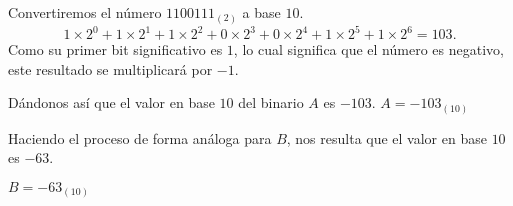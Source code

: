 \begin{frame}
\begin{solution}
\begin{enumerate}[a)]
			      Convertiremos el número ${1100111}_{\left(2\right)}$ a base $10$.
			      \begin{equation*}
				      1\times 2^{0}+
				      1\times2^{1}+
				      1\times2^{2}+
				      0\times2^{3}+
				      0\times2^{4}+
				      1\times2^{5}+
				      1\times2^{6}=
				      103.
			      \end{equation*}
			      Como su primer bit significativo es $1$, lo cual significa que el número es negativo, este resultado se multiplicará por $-1$.

			      Dándonos así que el valor en base $10$ del binario $A$ es $-103$. $A=-{103}_{\left(10\right)}$

			      Haciendo el proceso de forma análoga para $B$, nos resulta que el valor en base $10$ es $-63$.

			      $B=-{63}_{\left(10\right)}$
		\end{enumerate}
	\end{solution}
\end{frame}

